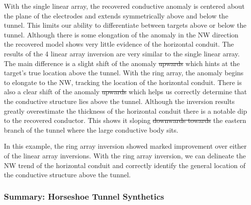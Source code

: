 \documentclass[preprint,authoryear,12pt]{elsarticle}
\providecommand{\DIFaddtex}[1]{{\protect\color{blue}\uwave{#1}}} %
\providecommand{\DIFdeltex}[1]{{\protect\color{red}\sout{#1}}}                      %
\providecommand{\DIFaddbegin}{} %
\providecommand{\DIFaddend}{} %
\providecommand{\DIFdelbegin}{} %
\providecommand{\DIFdelend}{} %
\providecommand{\DIFadd}[1]{\texorpdfstring{\DIFaddtex{#1}}{#1}} %
\providecommand{\DIFdel}[1]{\texorpdfstring{\DIFdeltex{#1}}{}} %
\begin{document}
With the single linear array, the recovered conductive anomaly is centered about the plane of the electrodes and extends symmetrically above and below the tunnel. This limits our ability to differentiate between targets above or below the tunnel. Although there is some elongation of the anomaly in the NW direction the recovered model shows very little evidence of the horizontal conduit. The results of the 4 linear array inversion are very similar to the single linear array. The main difference is a slight shift of the anomaly \DIFdelbegin \DIFdel{upwards }\DIFdelend \DIFaddbegin \DIFadd{upward }\DIFaddend which hints at the target's true location above the tunnel. With the ring array, the anomaly begins to elongate to the NW, tracking the location of the horizontal conduit. There is also a clear shift of the anomaly \DIFdelbegin \DIFdel{upwards }\DIFdelend \DIFaddbegin \DIFadd{upward }\DIFaddend which helps us correctly determine that the conductive structure lies above the tunnel. Although the inversion results greatly overestimate the thickness of the horizontal conduit there is a notable dip to the recovered conductor. This shows it sloping \DIFdelbegin \DIFdel{downwards towards }\DIFdelend \DIFaddbegin \DIFadd{downward toward }\DIFaddend the eastern branch of the tunnel where the large conductive body sits.

In this example, the ring array inversion showed marked improvement over either of the linear array inversions. With the ring array inversion, we can delineate the NW trend of the horizontal conduit and correctly identify the general location of the conductive structure above the tunnel.


\DIFdelbegin %

\DIFdelend \subsubsection{Summary: Horseshoe Tunnel Synthetics}
\label{sec:RingArray_Development_Horseshoe_Synthetics_Summary}
\end{document}
